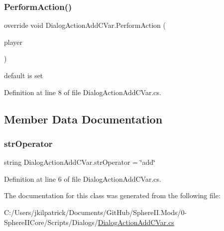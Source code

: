 \subsubsection{\texorpdfstring{PerformAction()}{PerformAction()}}
{\footnotesize\ttfamily override void Dialog\+Action\+Add\+C\+Var.\+Perform\+Action (\begin{DoxyParamCaption}\item[{Entity\+Player}]{player }\end{DoxyParamCaption})}

default is set 

Definition at line 8 of file Dialog\+Action\+Add\+C\+Var.\+cs.



\subsection{Member Data Documentation}
\mbox{\label{class_dialog_action_add_c_var_a7f9165f525e4976db76ef899772a0bf9}} 
\subsubsection{\texorpdfstring{strOperator}{strOperator}}
{\footnotesize\ttfamily string Dialog\+Action\+Add\+C\+Var.\+str\+Operator = \char`\"{}add\char`\"{}}



Definition at line 6 of file Dialog\+Action\+Add\+C\+Var.\+cs.



The documentation for this class was generated from the following file\+:\begin{DoxyCompactItemize}
\item 
C\+:/\+Users/jkilpatrick/\+Documents/\+Git\+Hub/\+Sphere\+I\+I.\+Mods/0-\/\+Sphere\+I\+I\+Core/\+Scripts/\+Dialogs/\mbox{\hyperlink{_dialog_action_add_c_var_8cs}{Dialog\+Action\+Add\+C\+Var.\+cs}}\end{DoxyCompactItemize}
